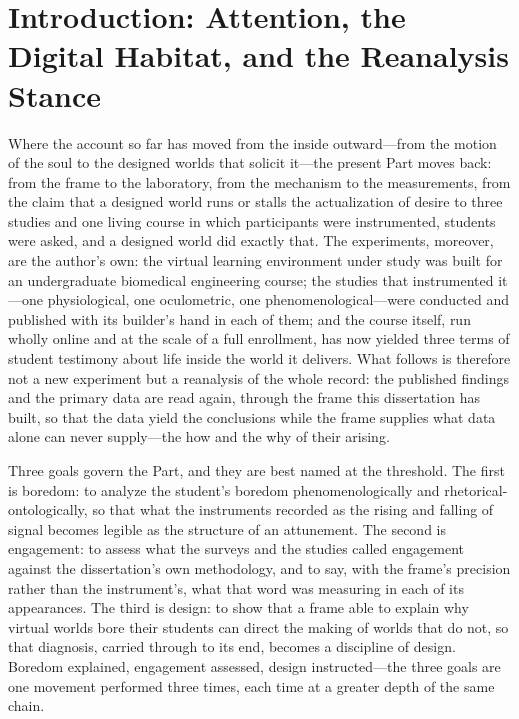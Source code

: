 
\section{Introduction: Attention, the Digital Habitat, and the Reanalysis Stance}

Where the account so far has moved from the inside outward---from the motion of the soul to the designed worlds that solicit it---the present Part moves back: from the frame to the laboratory, from the mechanism to the measurements, from the claim that a designed world runs or stalls the actualization of desire to three studies and one living course in which participants were instrumented, students were asked, and a designed world did exactly that. The experiments, moreover, are the author's own: the virtual learning environment under study was built for an undergraduate biomedical engineering course; the studies that instrumented it---one physiological, one oculometric, one phenomenological---were conducted and published with its builder's hand in each of them; and the course itself, run wholly online and at the scale of a full enrollment, has now yielded three terms of student testimony about life inside the world it delivers. What follows is therefore not a new experiment but a reanalysis of the whole record: the published findings and the primary data are read again, through the frame this dissertation has built, so that the data yield the conclusions while the frame supplies what data alone can never supply---the how and the why of their arising.

Three goals govern the Part, and they are best named at the threshold. The first is boredom: to analyze the student's boredom phenomenologically and rhetorical-ontologically, so that what the instruments recorded as the rising and falling of signal becomes legible as the structure of an attunement. The second is engagement: to assess what the surveys and the studies called engagement against the dissertation's own methodology, and to say, with the frame's precision rather than the instrument's, what that word was measuring in each of its appearances. The third is design: to show that a frame able to explain why virtual worlds bore their students can direct the making of worlds that do not, so that diagnosis, carried through to its end, becomes a discipline of design. Boredom explained, engagement assessed, design instructed---the three goals are one movement performed three times, each time at a greater depth of the same chain.

